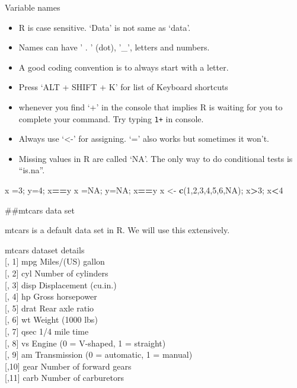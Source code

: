 \documentclass[ignorenonframetext,]{beamer}
\newenvironment{Shaded}{\begin{snugshade}}{\end{snugshade}}
\newcommand{\DecValTok}[1]{\textcolor[rgb]{0.00,0.00,0.81}{#1}}
\newcommand{\KeywordTok}[1]{\textcolor[rgb]{0.13,0.29,0.53}{\textbf{#1}}}
\newcommand{\NormalTok}[1]{#1}
\newcommand{\OperatorTok}[1]{\textcolor[rgb]{0.81,0.36,0.00}{\textbf{#1}}}
\newcommand{\OtherTok}[1]{\textcolor[rgb]{0.56,0.35,0.01}{#1}}
\newcommand{\StringTok}[1]{\textcolor[rgb]{0.31,0.60,0.02}{#1}}
\begin{document}
\begin{frame}[fragile]{Variable names}
\protect\hypertarget{variable-names}{}

\begin{itemize}
\item
  R is case sensitive. `Data' is not same as `data'.
\item
  Names can have ' . ' (dot), '\_', letters and numbers.
\item
  A good coding convention is to always start with a letter.
\item
  Press `ALT + SHIFT + K' for list of Keyboard shortcuts
\item
  whenever you find `+' in the console that implies R is waiting for you
  to complete your command. Try typing \texttt{1+} in console.
\item
  Always use `\textless{}-' for assigning. `=' also works but sometimes
  it won't.
\item
  Missing values in R are called `NA'. The only way to do conditional
  tests is ``is.na''.
\end{itemize}

\begin{Shaded}
\begin{Highlighting}[]
\NormalTok{x =}\DecValTok{3}\NormalTok{; y=}\DecValTok{4}\NormalTok{; x}\OperatorTok{==}\NormalTok{y}
\NormalTok{x =}\OtherTok{NA}\NormalTok{; y=}\OtherTok{NA}\NormalTok{; x}\OperatorTok{==}\NormalTok{y}
\NormalTok{x <-}\StringTok{ }\KeywordTok{c}\NormalTok{(}\DecValTok{1}\NormalTok{,}\DecValTok{2}\NormalTok{,}\DecValTok{3}\NormalTok{,}\DecValTok{4}\NormalTok{,}\DecValTok{5}\NormalTok{,}\DecValTok{6}\NormalTok{,}\OtherTok{NA}\NormalTok{); x}\OperatorTok{>}\DecValTok{3}\NormalTok{; x}\OperatorTok{<}\DecValTok{4}
\end{Highlighting}
\end{Shaded}

\#\#mtcars data set

mtcars is a default data set in R. We will use this extensively.

mtcars dataset details\\
{[}, 1{]} mpg Miles/(US) gallon\\
{[}, 2{]} cyl Number of cylinders\\
{[}, 3{]} disp Displacement (cu.in.)\\
{[}, 4{]} hp Gross horsepower\\
{[}, 5{]} drat Rear axle ratio\\
{[}, 6{]} wt Weight (1000 lbs)\\
{[}, 7{]} qsec 1/4 mile time\\
{[}, 8{]} vs Engine (0 = V-shaped, 1 = straight)\\
{[}, 9{]} am Transmission (0 = automatic, 1 = manual)\\
{[},10{]} gear Number of forward gears\\
{[},11{]} carb Number of carburetors


\end{frame}
\end{document}
